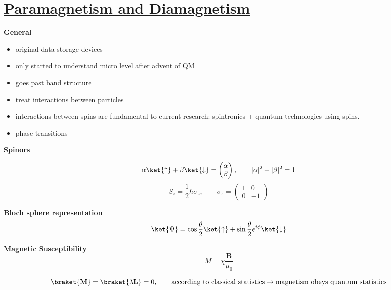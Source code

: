 \section[Paramagnetism and Diamagnetism]{\hyperlink{toc}{Paramagnetism and Diamagnetism}}


\textbf{General}
\begin{itemize}
    \item original data storage devices
    \item only started to understand micro level after advent of QM
    \item goes past band structure
    \item treat interactions between particles
    \item interactions between spins are fundamental to current research: spintronics + quantum technologies using spins.
    \item phase transitions
\end{itemize}

\textbf{Spinors}

\begin{equation}
    \alpha \ket{\uparrow} + \beta \ket{\downarrow} = \begin{pmatrix}
    \alpha  \\ \beta
    \end{pmatrix}, \qquad |\alpha|^2 + |\beta|^2 = 1
\end{equation}
\begin{equation}
    S_z = \frac{1}{2} \hbar \sigma_z, \qquad \sigma_z = \begin{pmatrix} 1 & 0 \\ 0 & -1 \end{pmatrix}
\end{equation}

\textbf{Bloch sphere representation}
\begin{equation}
    \ket{\Psi} = \cos{\frac{\theta}{2}}\ket{\uparrow} + \sin{\frac{\theta}{2}}e^{i\phi}\ket{\downarrow}
\end{equation}

\textbf{Magnetic Susceptibility}
\begin{equation}
    M = \chi \frac{\textbf{B}}{\mu_0}
\end{equation}

 \begin{tcolorbox}[enhanced,attach boxed title to top center={yshift=-3mm,yshifttext=-1mm},
  colback=blue!5!white,colframe=blue!75!black,colbacktitle=red!80!black,
  title=Bohr-van Leeuwen Theorem,fonttitle=\bfseries,
  boxed title style={size=small,colframe=red!50!black} ]
  \begin{equation}
      \braket{\textbf{M}} = \braket{\lambda \textbf{L}} = 0, \qquad \text{according to classical statistics} \rightarrow \text{magnetism obeys quantum statistics}
  \end{equation}
\end{tcolorbox}

